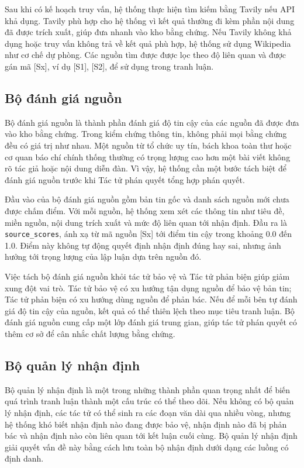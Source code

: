 ﻿\documentclass[oneside,a4paper,12pt]{extreport}
\begin{document}
Sau khi có kế hoạch truy vấn, hệ thống thực hiện tìm kiếm bằng Tavily nếu API khả dụng. Tavily phù hợp cho hệ thống vì kết quả thường đi kèm phần nội dung đã được trích xuất, giúp đưa nhanh vào kho bằng chứng. Nếu Tavily không khả dụng hoặc truy vấn không trả về kết quả phù hợp, hệ thống sử dụng Wikipedia như cơ chế dự phòng. Các nguồn tìm được được lọc theo độ liên quan và được gán mã [Sx], ví dụ [S1], [S2], để sử dụng trong tranh luận.

\subsection{Bộ đánh giá nguồn}

Bộ đánh giá nguồn là thành phần đánh giá độ tin cậy của các nguồn đã được đưa vào kho bằng chứng. Trong kiểm chứng thông tin, không phải mọi bằng chứng đều có giá trị như nhau. Một nguồn từ tổ chức uy tín, bách khoa toàn thư hoặc cơ quan báo chí chính thống thường có trọng lượng cao hơn một bài viết không rõ tác giả hoặc nội dung diễn đàn. Vì vậy, hệ thống cần một bước tách biệt để đánh giá nguồn trước khi Tác tử phán quyết tổng hợp phán quyết.

Đầu vào của bộ đánh giá nguồn gồm bản tin gốc và danh sách nguồn mới chưa được chấm điểm. Với mỗi nguồn, hệ thống xem xét các thông tin như tiêu đề, miền nguồn, nội dung trích xuất và mức độ liên quan tới nhận định. Đầu ra là \texttt{source\_scores}, ánh xạ từ mã nguồn [Sx] tới điểm tin cậy trong khoảng 0.0 đến 1.0. Điểm này không tự động quyết định nhận định đúng hay sai, nhưng ảnh hưởng tới trọng lượng của lập luận dựa trên nguồn đó.

Việc tách bộ đánh giá nguồn khỏi tác tử bảo vệ và Tác tử phản biện giúp giảm xung đột vai trò. Tác tử bảo vệ có xu hướng tận dụng nguồn để bảo vệ bản tin; Tác tử phản biện có xu hướng dùng nguồn để phản bác. Nếu để mỗi bên tự đánh giá độ tin cậy của nguồn, kết quả có thể thiên lệch theo mục tiêu tranh luận. Bộ đánh giá nguồn cung cấp một lớp đánh giá trung gian, giúp tác tử phán quyết có thêm cơ sở để cân nhắc chất lượng bằng chứng.

\subsection{Bộ quản lý nhận định}

Bộ quản lý nhận định là một trong những thành phần quan trọng nhất để biến quá trình tranh luận thành một cấu trúc có thể theo dõi. Nếu không có bộ quản lý nhận định, các tác tử có thể sinh ra các đoạn văn dài qua nhiều vòng, nhưng hệ thống khó biết nhận định nào đang được bảo vệ, nhận định nào đã bị phản bác và nhận định nào còn liên quan tới kết luận cuối cùng. Bộ quản lý nhận định giải quyết vấn đề này bằng cách lưu toàn bộ nhận định dưới dạng các luồng có định danh.
\end{document}
